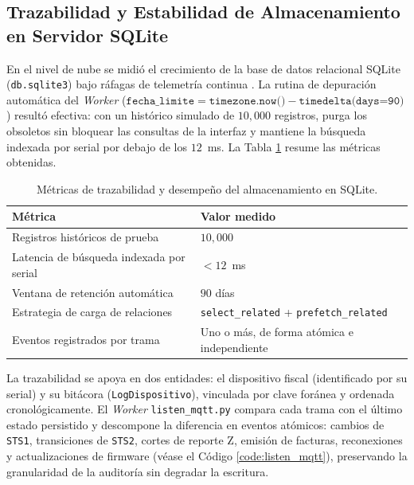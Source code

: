 \subsection{Trazabilidad y Estabilidad de Almacenamiento en Servidor SQLite}

\par En el nivel de nube se midió el crecimiento de la base de datos relacional SQLite (\texttt{db.sqlite3}) bajo ráfagas de telemetría continua \cite{Django_v5_Doc}. La rutina de depuración automática del \textit{Worker} ($\texttt{fecha\_limite} = \texttt{timezone.now()} - \texttt{timedelta(days=90)}$) resultó efectiva: con un histórico simulado de $10,000$ registros, purga los obsoletos sin bloquear las consultas de la interfaz y mantiene la búsqueda indexada por serial por debajo de los $12$~ms. La Tabla \ref{tab:sqlite} resume las métricas obtenidas.\\

\begin{table}[htbp]
\centering
\caption{Métricas de trazabilidad y desempeño del almacenamiento en SQLite.}
\label{tab:sqlite}
\begin{tabularx}{\textwidth}{@{}>{\raggedright\arraybackslash}X >{\raggedright\arraybackslash}p{5.5cm}@{}}
\toprule
\textbf{Métrica} & \textbf{Valor medido} \\
\midrule
Registros históricos de prueba & $10,000$ \\
Latencia de búsqueda indexada por serial & $< 12$~ms \\
Ventana de retención automática & $90$ días \\
Estrategia de carga de relaciones & \texttt{select\_related} + \texttt{prefetch\_related} \\
Eventos registrados por trama & Uno o más, de forma atómica e independiente \\
\bottomrule
\end{tabularx}
\end{table}

\par La trazabilidad se apoya en dos entidades: el dispositivo fiscal (identificado por su serial) y su bitácora (\texttt{LogDispositivo}), vinculada por clave foránea y ordenada cronológicamente. El \textit{Worker} \texttt{listen\_mqtt.py} compara cada trama con el último estado persistido y descompone la diferencia en eventos atómicos: cambios de \texttt{STS1}, transiciones de \texttt{STS2}, cortes de reporte Z, emisión de facturas, reconexiones y actualizaciones de firmware (véase el Código \ref{code:listen_mqtt}), preservando la granularidad de la auditoría sin degradar la escritura.\\

